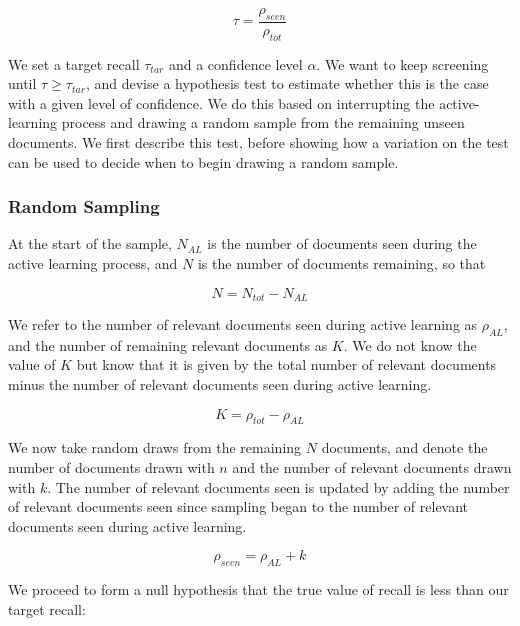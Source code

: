 \documentclass{bmcart}
\begin{document}
	\begin{equation}
	\tau = \frac{\rho_{seen}}{\rho_{tot}}
	\label{eq:recall-def}
	\end{equation}
	
	We set a target recall $\tau_{tar}$ and a confidence level $\alpha$. 
	We want to keep screening until $\tau \geq \tau_{tar}$, and devise a hypothesis test to estimate whether this is the case with a given level of confidence. 
	We do this	based on interrupting the active-learning process and drawing a random sample from the remaining unseen documents. 
	We first describe this test, before showing how a variation on the test can be used to decide when to begin drawing a random sample. 
	
	\subsubsection*{Random Sampling}
	
	At the start of the sample, $N_{AL}$ is the number of documents seen during the active learning process, and $N$ is the number of documents remaining, so that 
	
	\begin{equation}
	N = N_{tot} - N_{AL}
	\end{equation} 
	
	We refer to the number  of relevant documents seen during active learning as $\rho_{AL}$, and the number of remaining relevant documents as $K$. We do not know the value of $K$ but know that it is given by the total number of relevant documents minus the number of relevant documents seen during active learning.
	
	\begin{equation}
	K = \rho_{tot} - \rho_{AL}
	\label{eq:K}
	\end{equation}
	
	We now take random draws from the remaining $N$ documents, and denote the number of documents drawn with $n$ and the number of relevant documents drawn with $k$. The number of relevant documents seen is updated by adding the number of relevant documents seen since sampling began to the number of relevant documents seen during active learning.
	
	\begin{equation}
	\rho_{seen} = \rho_{AL} + k
	\label{eq:rho_seen}
	\end{equation}
	
	We proceed to form a null hypothesis that the true value of recall is less than our target recall:
	
\end{document}
